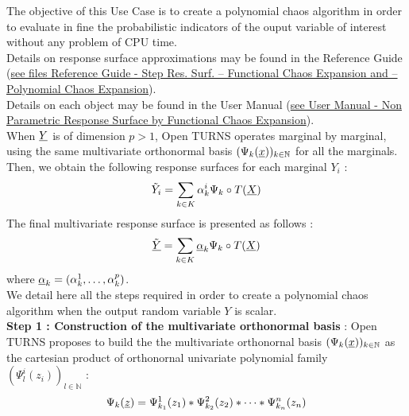 \renewcommand{\filename}{docUC_RespSurface_PolyChaosExpansion.tex}
\renewcommand{\filetitle}{UC : Creation of a polynomial chaos algorithm}

\HeaderIIILevel


The objective of this Use Case is to create a polynomial chaos algorithm in order to evaluate in fine the probabilistic indicators of the ouput variable of interest without any problem of CPU time.\\



Details on response surface approximations may be found in the Reference Guide (\href{OpenTURNS_ReferenceGuide.pdf}{see files Reference Guide - Step Res. Surf. -- Functional Chaos Expansion and -- Polynomial Chaos Expansion}).\\

Details on each object may be found in the User Manual  (\href{OpenTURNS_UserManual_TUI.pdf}{see User Manual - Non Parametric Response Surface by Functional Chaos Expansion}).\\

When ${\underline{Y}}$ is of dimension $p>1$,  Open TURNS operates marginal by marginal, using the same multivariate orthonormal basis $(\Psi_k({\underline{x}}))_{k \in \mathbb{N}}$ for all the marginals. Then, we obtain the following response surfaces for each marginal $Y_i$ : 
$$
\tilde{Y}_i = \sum_{k \in K} \alpha_k^i \Psi_k \circ T({\underline{X}})
$$
The final multivariate response surface is presented as follows :
$$
\tilde{{\underline{Y}}} = \sum_{k \in K} {\underline{\alpha}}_k \Psi_k \circ T({\underline{X}})
$$ 
where ${\underline{\alpha}}_k = ( \alpha_k^1, \dots,  \alpha_k^p)$.\\

We detail here all the steps required in order to create a polynomial chaos algorithm  when the output random variable $Y$ is scalar.\\


{\bf Step 1 : Construction of the multivariate orthonormal basis } : Open TURNS proposes to build the the multivariate orthonornal basis $(\Psi_k({\underline{x}}))_{k \in \mathbb{N}}$ as the cartesian product of orthonornal univariate polynomial family $(\Psi_{l}^i(z_i))_{l \in \mathbb{N}}$ :
$$
\Psi_k({\underline{z}}) = \Psi_{k_1}^1(z_1) * \Psi_{k_2}^2(z_2) * \dots *  \Psi_{k_n}^n(z_n)
$$

